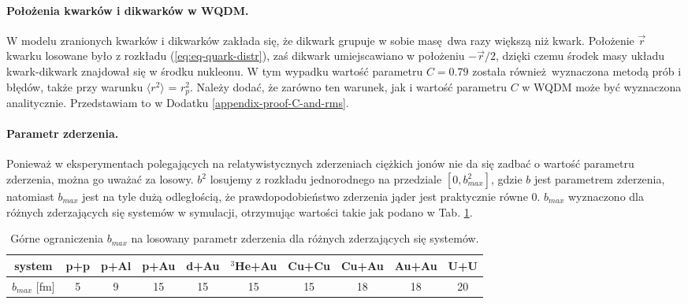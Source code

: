 \documentclass[a4paper,12pt]{article}
\begin{document}
\paragraph{Położenia kwarków i dikwarków w WQDM.}
W modelu zranionych kwarków i dikwarków zakłada się, że dikwark grupuje w sobie masę dwa razy większą niż kwark. Położenie $\vec{r}$ kwarku losowane było z rozkładu (\ref{eq:eq-quark-distr}), zaś dikwark umiejscawiano w położeniu $-\vec{r}/2$, dzięki czemu środek masy układu kwark-dikwark znajdował się w środku nukleonu. W tym wypadku wartość parametru $C=0.79$ została również wyznaczona metodą prób i błędów, także przy warunku $\langle r^2 \rangle$  = $r_p^2$. Należy dodać, że zarówno ten warunek, jak i wartość parametru $C$ w WQDM może być wyznaczona analitycznie. Przedstawiam to w Dodatku \ref{appendix-proof-C-and-rms}.

\paragraph{Parametr zderzenia.}
Ponieważ w eksperymentach polegających na relatywistycznych zderzeniach ciężkich jonów nie da się zadbać o wartość parametru zderzenia, można go uważać za losowy. $b^2$ losujemy z rozkładu jednorodnego na przedziale $[0, b_{max}^2]$, gdzie $b$ jest parametrem zderzenia, natomiast $b_{max}$ jest na tyle dużą odległością, że prawdopodobieństwo zderzenia jąder jest praktycznie równe 0. $b_{max}$ wyznaczono dla różnych zderzających się systemów w symulacji, otrzymując wartości takie jak podano w Tab. \ref{table:b-max}.

\begin{table}[h!]
\begin{center}
\begin{tabular}{|c|c|c|c|c|c|c|c|c|c|} \hline
system & p+p & p+Al & p+Au & d+Au & $^3$He+Au & Cu+Cu & Cu+Au & Au+Au & U+U \\ \hline
$b_{max}$ [fm] & 5 & 9 & 15 & 15 & 15 & 15 & 18 & 18 & 20  \\ \hline
\end{tabular}
\caption{\label{table:b-max} 
Górne ograniczenia $b_{max}$ na losowany parametr zderzenia dla różnych zderzających się systemów.}
\end{center}
\end{table}
\end{document}
